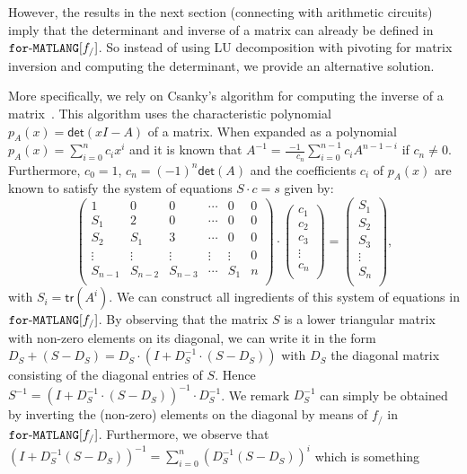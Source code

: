However, the results
in the next section (connecting \langfor with arithmetic circuits) imply that the determinant
and inverse of a matrix can already be defined in $\texttt{for}\text{-}\texttt{MATLANG}[f_/]$. So instead of using LU decomposition with pivoting for matrix inversion and computing the determinant, we provide an alternative solution.

More specifically, we rely on Csanky's algorithm for computing the inverse of a matrix~\cite{Csanky76}. This algorithm uses the characteristic
polynomial $p_A(x)=\mathsf{det}(xI-A)$ of a matrix. When expanded as a polynomial
$p_A(x)=\sum_{i=0}^{n} c_i x^i$ and it is known that $A^{-1}=\frac{-1}{\phantom{-1}c_n}\sum_{i=0}^{n-1}c_i A^{n-1-i}$
if $c_n\neq 0$. Furthermore, $c_0=1$, $c_n=(-1)^n\mathsf{det}(A)$ and the coefficients $c_i$ of $p_A(x)$
are known to satisfy the system of equations $S\cdot c=s$ given by:
$$
\left(\begin{matrix}
1 & 0 & 0 & \cdots & 0 & 0\\
S_1 & 2 & 0 & \cdots  &0 & 0\\
S_2 & S_1 & 3 & \cdots  &0 & 0\\
\vdots & \vdots & \vdots & \vdots & \vdots & 0\\
S_{n-1} & S_{n-2} & S_{n-3} & \cdots & S_1 & n\\
\end{matrix}\right)\cdot
\left(\begin{matrix}
c_1\\
c_2\\
c_3\\
\vdots\\
c_n\\
\end{matrix}\right)=\left(\begin{matrix}
S_1\\
S_2\\
S_3\\
\vdots\\
S_n\\
\end{matrix}\right),
$$
with $S_i=\mathsf{tr}(A^i)$. We can construct all ingredients of this system of equations in $\texttt{for}\text{-}\texttt{MATLANG}[f_/]$. By observing that the matrix $S$ is a lower triangular matrix with non-zero elements on its diagonal, we can write it in the form $D_S+(S-D_{S})=D_S\cdot(I+D_S^{-1}\cdot (S-D_S))$ with $D_S$ the diagonal matrix consisting of the diagonal entries of $S$.
Hence $S^{-1}=(I+D_{S}^{-1}\cdot(S-D_{S}))^{-1}\cdot D_S^{-1}$. 
We remark $D_S^{-1}$ can simply be obtained by inverting the (non-zero) elements on the diagonal by means of $f_/$ in $\texttt{for}\text{-}\texttt{MATLANG}[f_/]$. Furthermore, we observe that $(I+D_S^{-1}(S-D_S))^{-1}=\sum_{i=0}^{n}(D_S^{-1}(S-D_S))^i$ which is something
